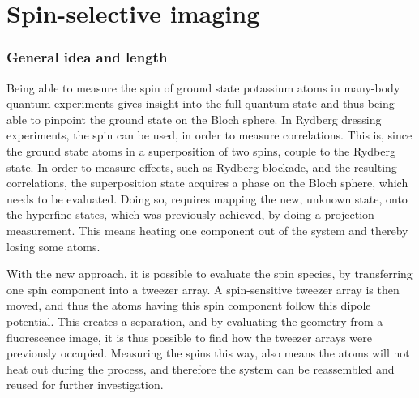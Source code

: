 \chapter{Spin-selective imaging}%
\label{ch:spin_resolved}
\subsection*{General idea and length}


Being able to measure the spin of ground state potassium atoms in many-body quantum experiments gives insight into the full quantum state and thus being able to pinpoint the ground state on the Bloch sphere. In Rydberg dressing experiments, the spin can be used, in order to measure correlations. This is, since the ground state atoms in a superposition of two spins, couple to the Rydberg state. In order to measure effects, such as Rydberg blockade, and the resulting correlations, the superposition state acquires a phase on the Bloch sphere, which needs to be evaluated. Doing so, requires mapping the new, unknown state, onto the hyperfine states, which was previously achieved, by doing a projection measurement. This means heating one component out of the system and thereby losing some atoms.

With the new approach, it is possible to evaluate the spin species, by transferring one spin component into a tweezer array. A spin-sensitive tweezer array is then moved, and thus the atoms having this spin component follow this dipole potential. This creates a separation, and by evaluating the geometry from a fluorescence image, it is thus possible to find how the tweezer arrays were previously occupied. Measuring the spins this way, also means the atoms will not heat out during the process, and therefore the system can be reassembled and reused for further investigation.

